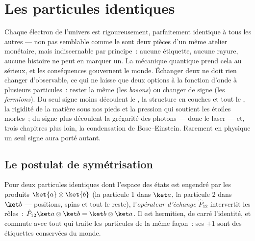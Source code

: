 \chapter{Les particules identiques}\label{ch:b3:identical-particles}

Chaque électron de l'univers est rigoureusement, parfaitement
identique à tous les autres --- non pas semblable comme le sont deux
pièces d'un même atelier monétaire, mais indiscernable par principe~:
aucune étiquette, aucune rayure, aucune histoire ne peut en marquer
un. La mécanique quantique prend cela au sérieux, et les conséquences
gouvernent le monde. Échanger deux  ne doit rien
changer d'observable, ce qui ne laisse que deux options à la fonction
d'onde à plusieurs particules~: rester la même (les \emph{bosons}) ou
changer de signe (les \emph{fermions}). Du seul signe moins découlent
le , la structure en couches et tout le
, la rigidité de la matière sous nos pieds et la
pression qui soutient les étoiles mortes~; du signe plus découlent la
grégarité des photons --- donc le laser --- et, trois chapitres plus
loin, la condensation de Bose--Einstein. Rarement en physique un seul
signe aura porté autant.

\section{Le postulat de symétrisation}

\begin{definition}[L'échange]\label{def:b3:identical-particles:exchange}
Pour deux particules identiques dont l'espace des états est engendré
par les produits $\ket{a}\otimes\ket{b}$ (la particule 1 dans $\ket a$,
la particule 2 dans $\ket b$ --- positions, spins et tout le reste),
l'\emph{opérateur d'échange} $\hat P_{12}$ intervertit les rôles~: $\hat P_{12}\ket a\otimes\ket b =
\ket b\otimes\ket a$. Il est hermitien, de carré l'identité, et
commute avec tout  qui traite les particules de la même
façon~: ses  $\pm1$ sont des étiquettes conservées du
monde.
\end{definition}

